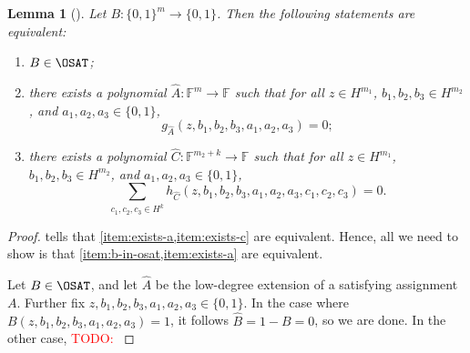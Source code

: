 \documentclass[english,12pt]{reedthesis}
\theoremstyle{plain}
\newtheorem{lemma}[lemma]{Lemma}
\theoremstyle{definition}
\theoremstyle{remark}
\newcommand{\TODO}[1]{\textcolor{red}{TODO: #1}}
\begin{document}
\begin{lemma}[{\cite[Claim 6.5]{GOS25}}]\label{lem:three-equiv}
  Let $B\colon \{0, 1\}^{m} \rightarrow \{0, 1\}$. Then the following statements are
  equivalent:
  \begin{enumerate}
    \item\label{item:b-in-osat} $B \in \OSAT$;
    \item\label{item:exists-a} there exists a polynomial
          $\hat{A}\colon \mathbb{F}^{m} \rightarrow \mathbb{F}$ such that for all
          $z \in H^{m_{1}}$, $b_{1}, b_{2}, b_{3} \in H^{m_{2}}$, and
          $a_{1}, a_{2}, a_{3} \in \{0, 1\}$,
          \begin{equation}
            g_{\hat{A}}(z, b_{1}, b_{2}, b_{3}, a_{1}, a_{2}, a_{3}) = 0;
          \end{equation}
    \item\label{item:exists-c} there exists a polynomial
          $\hat{C}\colon \mathbb{F}^{m_{2}+k} \rightarrow \mathbb{F}$ such that for all
          $z \in H^{m_{1}}$, $b_{1}, b_{2}, b_{3} \in H^{m_{2}}$, and
          $a_{1}, a_{2}, a_{3} \in \{0, 1\}$,
          \begin{equation}
            \sum_{c_{1}, c_{2}, c_{3} \in H^{k}}h_{\hat{C}}(z, b_{1}, b_{2}, b_{3}, a_{1}, a_{2}, a_{3}, c_{1}, c_{2}, c_{3}) = 0.
          \end{equation}
  \end{enumerate}
\end{lemma}

\begin{proof}
   tells that \cref{item:exists-a,item:exists-c}
  are equivalent. Hence, all we need to show is that
  \cref{item:b-in-osat,item:exists-a} are equivalent.

  Let $B \in \OSAT$, and let $\hat{A}$ be the low-degree extension of a satisfying
  assignment $A$. Further fix
  $z, b_{1}, b_{2}, b_{3}, a_{1}, a_{2}, a_{3} \in \{0, 1\}$. In the case where
  $B(z, b_{1}, b_{2}, b_{3}, a_{1}, a_{2}, a_{3}) = 1$, it follows
  $\hat{B} = 1 - B = 0$, so we are done. In the other case,
  \TODO{}
\end{proof}
\end{document}
